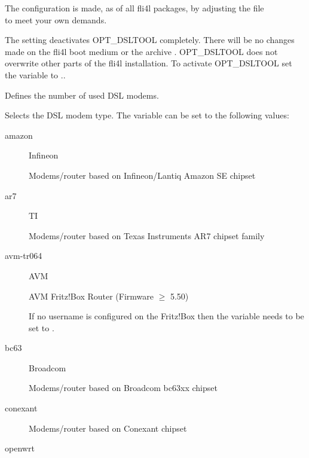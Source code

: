   The configuration is made, as of all fli4l packages, by adjusting the file\\
   to meet your own demands.

\begin{description}


  The setting  deactivates OPT\_DSLTOOL completely. There will be no changes
  made on the fli4l boot medium or the archive .
  OPT\_DSLTOOL does not overwrite other parts of the fli4l installation.
  To activate OPT\_DSLTOOL set the variable  to ..


  Defines the number of used DSL modems.


  Selects the DSL modem type. The variable can be set to the following values:

\begin{description}
\item[amazon] Infineon 

  Modems/router based on Infineon/Lantiq Amazon SE chipset

\item[ar7] TI 

  Modems/router based on Texas Instruments AR7 chipset family

\item[avm-tr064] AVM 

  AVM Fritz!Box Router (Firmware $\ge$ 5.50)

  If no username is configured on the Fritz!Box then the variable 
  needs to be set to .

\item[bc63] Broadcom 

  Modems/router based on Broadcom bc63xx chipset

\item[conexant] 

  Modems/router based on Conexant chipset

\item[openwrt] 


\end{description}
\end{description}
